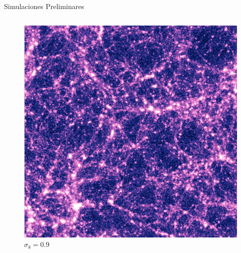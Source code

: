\documentclass{beamer}
\begin{document}
\begin{frame}{Simulaciones Preliminares}
	\begin{columns}
		\begin{column}{0.5\textwidth}
			\begin{figure}[!h]
			\begin{center}
				\includegraphics[width=\textwidth]{im/res1.png}
				\caption{$\sigma_8=0.9$} 
				\label{fig:res1}
			\end{center}
		\end{figure}
		\end{column}
		

\end{columns}
\end{frame}
\end{document}
